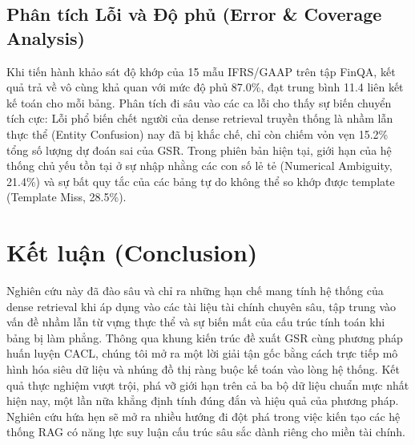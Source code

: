 \documentclass[10pt, a4paper]{article}
\begin{document}
\subsection{Phân tích Lỗi và Độ phủ (Error \& Coverage Analysis)}

Khi tiến hành khảo sát độ khớp của 15 mẫu IFRS/GAAP trên tập FinQA, kết quả trả về vô cùng khả quan với mức độ phủ 87.0\%, đạt trung bình 11.4 liên kết kế toán cho mỗi bảng. Phân tích đi sâu vào các ca lỗi cho thấy sự biến chuyển tích cực: Lỗi phổ biến chết người của dense retrieval truyền thống là nhầm lẫn thực thể (Entity Confusion) nay đã bị khắc chế, chỉ còn chiếm vỏn vẹn 15.2\% tổng số lượng dự đoán sai của GSR. Trong phiên bản hiện tại, giới hạn của hệ thống chủ yếu tồn tại ở sự nhập nhằng các con số lẻ tẻ (Numerical Ambiguity, 21.4\%) và sự bất quy tắc của các bảng tự do không thể so khớp được template (Template Miss, 28.5\%).

\section{Kết luận (Conclusion)}

Nghiên cứu này đã đào sâu và chỉ ra những hạn chế mang tính hệ thống của dense retrieval khi áp dụng vào các tài liệu tài chính chuyên sâu, tập trung vào vấn đề nhầm lẫn từ vựng thực thể và sự biến mất của cấu trúc tính toán khi bảng bị làm phẳng. Thông qua khung kiến trúc đề xuất GSR cùng phương pháp huấn luyện CACL, chúng tôi mở ra một lời giải tận gốc bằng cách trực tiếp mô hình hóa siêu dữ liệu và nhúng đồ thị ràng buộc kế toán vào lòng hệ thống. Kết quả thực nghiệm vượt trội, phá vỡ giới hạn trên cả ba bộ dữ liệu chuẩn mực nhất hiện nay, một lần nữa khẳng định tính đúng đắn và hiệu quả của phương pháp. Nghiên cứu hứa hẹn sẽ mở ra nhiều hướng đi đột phá trong việc kiến tạo các hệ thống RAG có năng lực suy luận cấu trúc sâu sắc dành riêng cho miền tài chính.
\end{document}
